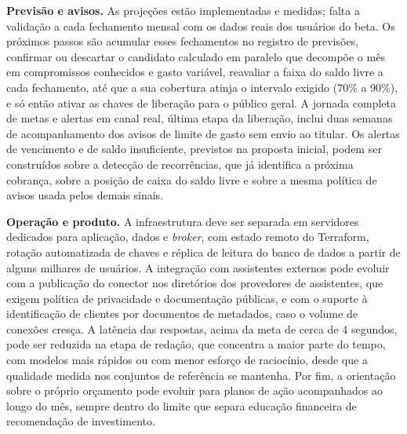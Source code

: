\textbf{Previsão e avisos.} As projeções estão implementadas e medidas; falta a validação a cada fechamento mensal com os dados reais dos usuários do beta. Os próximos passos são acumular esses fechamentos no registro de previsões, confirmar ou descartar o candidato calculado em paralelo que decompõe o mês em compromissos conhecidos e gasto variável, reavaliar a faixa do saldo livre a cada fechamento, até que a sua cobertura atinja o intervalo exigido (70\% a 90\%), e só então ativar as chaves de liberação para o público geral. A jornada completa de metas e alertas em canal real, última etapa da liberação, inclui duas semanas de acompanhamento dos avisos de limite de gasto sem envio ao titular. Os alertas de vencimento e de saldo insuficiente, previstos na proposta inicial, podem ser construídos sobre a detecção de recorrências, que já identifica a próxima cobrança, sobre a posição de caixa do saldo livre e sobre a mesma política de avisos usada pelos demais sinais.

\textbf{Operação e produto.} A infraestrutura deve ser separada em servidores dedicados para aplicação, dados e \textit{broker}, com estado remoto do Terraform, rotação automatizada de chaves e réplica de leitura do banco de dados a partir de alguns milhares de usuários. A integração com assistentes externos pode evoluir com a publicação do conector nos diretórios dos provedores de assistentes, que exigem política de privacidade e documentação públicas, e com o suporte à identificação de clientes por documentos de metadados, caso o volume de conexões cresça. A latência das respostas, acima da meta de cerca de 4 segundos, pode ser reduzida na etapa de redação, que concentra a maior parte do tempo, com modelos mais rápidos ou com menor esforço de raciocínio, desde que a qualidade medida nos conjuntos de referência se mantenha. Por fim, a orientação sobre o próprio orçamento pode evoluir para planos de ação acompanhados ao longo do mês, sempre dentro do limite que separa educação financeira de recomendação de investimento.
